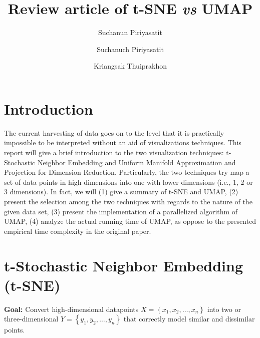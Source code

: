 \documentclass[runningheads]{llncs}
\begin{document}
%
\title{Review article of t-SNE \textit{vs} UMAP}
%
%
\author{Suchanun Piriyasatit \and
Suchanuch Piriyasatit\and
Kriangsak Thuiprakhon}
%
%
%
\maketitle              %
%
\section{Introduction}
    The current harvesting of data goes on to the level that it is practically impossible to be interpreted without an aid of visualizations techniques. 
   This report will give a brief introduction to the two visualization techniques: t-Stochastic Neighbor Embedding and Uniform Manifold Approximation and Projection for Dimension Reduction. Particularly, the two techniques try map a set of data points in high dimensions into one with lower dimensions (i.e., 1, 2 or 3 dimensions). In fact, we will (1) give a summary of t-SNE and UMAP, (2) present the selection among the two techniques with regards to the nature of the given data set, (3) present the implementation of a parallelized algorithm of UMAP, (4) analyze the actual running time of UMAP, as oppose to the presented empirical time complexity in the original paper. 
\section{ t-Stochastic Neighbor Embedding (t-SNE)}
	    
		\textbf{Goal:} Convert high-dimensional datapoints $X=\left\{x_{1}, x_{2}, \ldots, x_{n}\right\}$ into two or three-dimensional $Y = \left\{y_{1}, y_{2}, \dots, y_{n}\right\}$ that  correctly model similar and dissimilar points.
\end{document}
